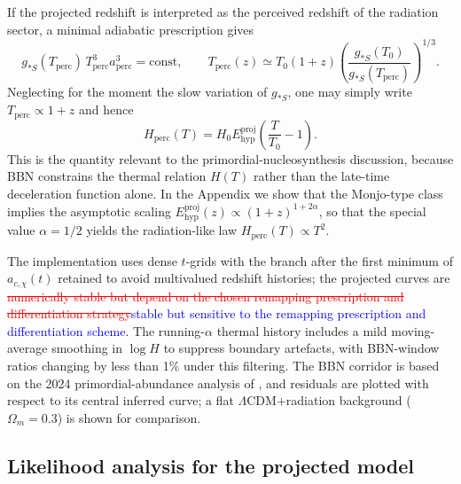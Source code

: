 \documentclass[3p,times,twocolumn]{elsarticle}
\begin{document}
If the projected redshift is interpreted as the perceived redshift of the radiation sector, a minimal adiabatic prescription gives
\begin{equation}
g_{*S}(T_{\mathrm{perc}})\,T_{\mathrm{perc}}^3 a_{\mathrm{perc}}^3=
\mathrm{const},
\qquad
T_{\mathrm{perc}}(z)\simeq T_0(1+z)
\left(\frac{g_{*S}(T_0)}{g_{*S}(T_{\mathrm{perc}})}\right)^{1/3}.
\end{equation}
Neglecting for the moment the slow variation of $g_{*S}$, one may simply write $T_{\mathrm{perc}}\propto 1+z$ and hence
\begin{equation}
H_{\mathrm{perc}}(T)=H_0 E_{\mathrm{hyp}}^{\mathrm{proj}}\!\left(\frac{T}{T_0}-1\right).
\end{equation}
This is the quantity relevant to the primordial-nucleosynthesis discussion, because BBN constrains the thermal relation $H(T)$ rather than the late-time deceleration function alone. In the Appendix we show that the Monjo-type class implies the asymptotic scaling $E_{\mathrm{hyp}}^{\mathrm{proj}}(z)\propto (1+z)^{1+2\alpha}$, so that the special value $\alpha=1/2$ yields the radiation-like law $H_{\mathrm{perc}}(T)\propto T^2$.

The implementation uses dense $t$-grids with the branch after the first minimum of $a_{c,\chi}(t)$ retained to avoid multivalued redshift histories; the projected curves are \textcolor{red}{\sout{numerically stable but depend on the chosen remapping prescription and differentiation strategy}}\textcolor{blue}{stable but sensitive to the remapping prescription and differentiation scheme}. The running-$\alpha$ thermal history includes a mild moving-average smoothing in $\log H$ to suppress boundary artefacts, with BBN-window ratios changing by less than 1\% under this filtering. The BBN corridor is based on the 2024 primordial-abundance analysis of \cite{schoneberg2024bbn}, and residuals are plotted with respect to its central inferred curve; a flat $\Lambda$CDM$+$radiation background ($\Omega_m=0.3$) is shown for comparison.

\subsection{Likelihood analysis for the projected model}
\end{document}
